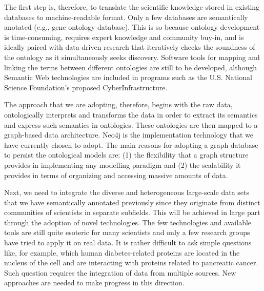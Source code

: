 \documentclass[11pt, a4paper]{article} %
\begin{document}
{The first step is, therefore, to translate the scientific knowledge stored in existing databases to machine-readable format. Only a few databases are semantically anotated (e.g., gene ontology database). This is so because ontology development is time-consuming, requires expert knowledge and community buy-in, and is ideally paired with data-driven research that iteratively checks the soundness of the ontology as it simultaneously seeks discovery. Software tools for mapping and linking the terms between different ontologies are still to be developed, although Semantic Web technologies are included in programs such as the U.S. National Science Foundation's proposed CyberInfrastructure.

The approach that we are adopting, therefore, begins with the raw data, ontologically interprets and transforms the data in order to extract its semantics and express such semantics in ontologies. These ontologies are then mapped to a graph-based data architecture. Neo4j is the implementation technology that we have currently chosen to adopt. The main reasons for adopting a graph database to persist the ontological models are: (1) the flexibility that a graph structure provides in implementing any modelling paradigm and (2) the scalability it provides in terms of organizing and accessing massive amounts of data.

Next, we need to integrate the diverse and heterogeneous large-scale data sets that we have semantically annotated previously since they originate from distinct communities of scientists in separate subfields. This will be achieved in large part through the adoption of novel technologies. The few technologies and available tools are still quite esoteric for many scientists and only a few research groups have tried to apply it on real data. It is rather difficult to ask simple questions like, for example, which human diabetes-related proteins are located in the nucleus of the cell and are interacting with proteins related to pancreatic cancer. Such question requires the integration of data from multiple sources. New approaches are needed to make progress in this direction.

}
\end{document}
